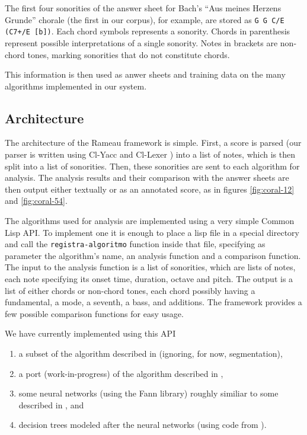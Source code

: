 \documentclass{article}
\begin{document}
The first four sonorities of the answer sheet for Bach's ``Aus meines
Herzens Grunde'' chorale (the first in our corpus), for example, are
stored as \texttt{G G C/E (C7+/E [b])}. Each chord symbols represents
a sonority. Chords in parenthesis represent possible interpretations
of a single sonority. Notes in brackets are non-chord tones, marking
sonorities that do not constitute chords.

This information is then used as anwer sheets and training data on the
many algorithms implemented in our system.

\subsection{Architecture}
\label{sec:architecture-and-api}

The architecture of the Rameau framework is simple. First, a score is
parsed (our parser is written using Cl-Yacc
\cite{chroboczek:_cl_yacc_manual} and Cl-Lexer
\cite{parker:_lexer_packag}) into a list of notes, which is then split
into a list of sonorities. Then, these sonorities are sent to each
algorithm for analysis. The analysis results and their comparison with
the answer sheets are then output either textually or as an annotated
score, as in figures \ref{fig:coral-12} and \ref{fig:coral-54}.

The algorithms used for analysis are implemented using a very simple
Common Lisp API. To implement one it is enough to place a lisp file in
a special directory and call the \texttt{registra-algoritmo} function
inside that file, specifying as parameter the algorithm's name, an
analysis function and a comparison function. The input to the analysis
function is a list of sonorities, which are lists of notes, each note
specifying its onset time, duration, octave and pitch. The output is a
list of either chords or non-chord tones, each chord possibly having a
fundamental, a mode, a seventh, a bass, and additions. The framework
provides a few possible comparison functions for easy usage.

We have currently implemented using this API 
\begin{enumerate}
\item a subset of the algorithm described in \cite{pardo02:algorithms}
  (ignoring, for now, segmentation), 
\item a port (work-in-progress) of the algorithm described in
  \cite{temperley99:modeling}, 
\item some neural networks (using the Fann \cite{nissen:fann}
  library) roughly similiar to some described in
  \cite{tsui02:_harmon_analy_using_neural_networ}, and
\item decision trees modeled after the neural networks (using code
  from \cite{Mitchell:1997:ML}).
\end{enumerate}
\end{document}
